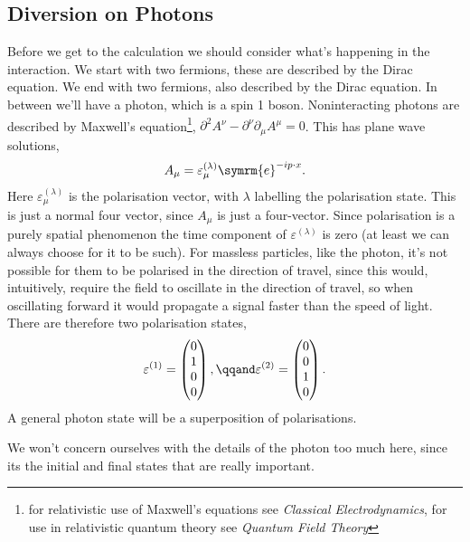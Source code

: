 \documentclass[fleqn]{NotesClass}
\newcommand{\course}[1]{\textit{#1}}
\newcommand{\e}{\symrm{e}}
\newcommand{\dalembertian}{\partial^2}
\begin{document}
    \subsection{Diversion on Photons}
    Before we get to the calculation we should consider what's happening in the interaction.
    We start with two fermions, these are described by the Dirac equation.
    We end with two fermions, also described by the Dirac equation.
    In between we'll have a photon, which is a spin 1 boson.
    Noninteracting photons are described by Maxwell's equation\footnote{for relativistic use of Maxwell's equations see \course{Classical Electrodynamics}, for use in relativistic quantum theory see \course{Quantum Field Theory}}, \(\dalembertian A^\nu - \partial^\nu\partial_\mu A^\mu = 0\).
    This has plane wave solutions,
    \begin{equation}
        A_\mu = \varepsilon_\mu^{(\lambda)} \e^{-ip\cdot x}.
    \end{equation}
    Here \(\varepsilon_\mu^{(\lambda)}\) is the polarisation vector, with \(\lambda\) labelling the polarisation state.
    This is just a normal four vector, since \(A_\mu\) is just a four-vector.
    Since polarisation is a purely spatial phenomenon the time component of \(\varepsilon^{(\lambda)}\) is zero (at least we can always choose for it to be such).
    For massless particles, like the photon, it's not possible for them to be polarised in the direction of travel, since this would, intuitively, require the field to oscillate in the direction of travel, so when oscillating forward it would propagate a signal faster than the speed of light.
    There are therefore two polarisation states,
    \begin{equation}
        \varepsilon^{(1)} = 
        \begin{pmatrix}
            0\\ 1\\ 0\\ 0
        \end{pmatrix}
        , \qqand \varepsilon^{(2)} = 
        \begin{pmatrix}
            0\\ 0\\ 1\\ 0
        \end{pmatrix}
        .
    \end{equation}
    A general photon state will be a superposition of polarisations.
    
    We won't concern ourselves with the details of the photon too much here, since its the initial and final states that are really important.
    
\end{document}
